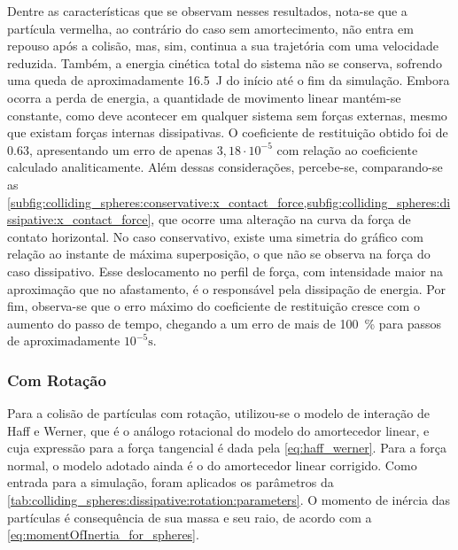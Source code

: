 Dentre as características que se observam nesses resultados, nota-se que a partícula vermelha, ao contrário do caso sem amortecimento, não entra em repouso após a colisão, mas, sim, continua a sua trajetória com uma velocidade reduzida. Também, a energia cinética total do sistema não se conserva, sofrendo uma queda de aproximadamente \SI{16,5}{\joule} do início até o fim da simulação. Embora ocorra a perda de energia, a quantidade de movimento linear mantém-se constante, como deve acontecer em qualquer sistema sem forças externas, mesmo que existam forças internas dissipativas. O coeficiente de restituição obtido foi de \SI{0,63}{}, apresentando um erro de apenas \(3,18\cdot 10^{-5}\) com relação ao coeficiente calculado analiticamente. Além dessas considerações, percebe-se, comparando-se as \cref{subfig:colliding_spheres:conservative:x_contact_force,subfig:colliding_spheres:dissipative:x_contact_force}, que ocorre uma alteração na curva da força de contato horizontal. No caso conservativo, existe uma simetria do gráfico com relação ao instante de máxima superposição, o que não se observa na força do caso dissipativo. Esse deslocamento no perfil de força, com intensidade maior na aproximação que no afastamento, é o responsável pela dissipação de energia. Por fim, observa-se que o erro máximo do coeficiente de restituição cresce com o aumento do passo de tempo, chegando a um erro de mais de \SI{100}{\percent} para passos de aproximadamente \(10^{-5}\si{\second}\).

\subsubsection{Com Rotação}

Para a colisão de partículas com rotação, utilizou-se o modelo de interação de Haff e Werner, que é o análogo rotacional do modelo do amortecedor linear, e cuja expressão para a força tangencial é dada pela \cref{eq:haff_werner}. Para a força normal, o modelo adotado ainda é o do amortecedor linear corrigido. Como entrada para a simulação, foram aplicados os parâmetros da \cref{tab:colliding_spheres:dissipative:rotation:parameters}. O momento de inércia das partículas é consequência de sua massa e seu raio, de acordo com a \cref{eq:momentOfInertia_for_spheres}.

